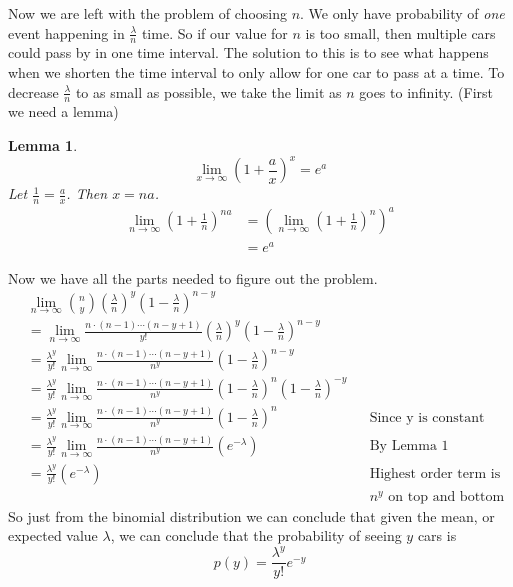 \documentclass{article}
\theoremstyle{plain}
\newtheorem{lemma}{Lemma}
\theoremstyle{definition}
\theoremstyle{remark}
\begin{document}
Now we are left with the problem of choosing $n$. We only have probability of \textit{one} event happening in $\frac{\lambda}{n}$ time. So if our value for $n$ is too small, then multiple cars could pass by in one time interval. The solution to this is to see what happens when we shorten the time interval to only allow for one car to pass at a time. To decrease $\frac{\lambda}{n}$ to as small as possible, we take the limit as $n$ goes to infinity. (First we need a lemma)
\begin{lemma}
$$\lim_{x \to \infty} \left( 1 + \frac{a}{x} \right)^{x} = e^a$$
Let $\displaystyle \frac{1}{n} = \displaystyle \frac{a}{x}$. Then $x = na$.
\begin{align*}
\lim_{n \to \infty} \left( 1 + \frac{1}{n} \right)^{na} &=  \left( \lim_{n \to \infty}(1 + \frac{1}{n} )^{n} \right)^a\\
&= e^a
\end{align*}
\end{lemma}
Now we have all the parts needed to figure out the problem.
\begin{align*}
  &\lim_{n \to \infty} {n \choose y}\left(\frac{\lambda}{n}\right)^{y}\left(1 - \frac{\lambda}{n}\right)^{n-y}\\
  &=\lim_{n \to \infty}\frac{n \cdot (n - 1) \cdots (n - y + 1)}{y!} \left( \frac{\lambda}{n} \right)^y \left(1 - \frac{\lambda}{n} \right)^{n-y}\\
  &= \frac{\lambda^y}{y!} \lim_{n \to \infty}\frac{n \cdot (n - 1) \cdots (n - y + 1)}{n^y} \left(1 - \frac{\lambda}{n} \right)^{n-y}\\
  &= \frac{\lambda^y}{y!} \lim_{n \to \infty}\frac{n \cdot (n - 1) \cdots (n - y + 1)}{n^y} \left(1 - \frac{\lambda}{n} \right)^{n} \left(1 - \frac{\lambda}{n} \right)^{-y}\\
  &= \frac{\lambda^y}{y!} \lim_{n \to \infty}\frac{n \cdot (n - 1) \cdots (n - y + 1)}{n^y} \left(1 - \frac{\lambda}{n} \right)^{n} && \text{Since y is constant}\\
  &= \frac{\lambda^y}{y!} \lim_{n \to \infty}\frac{n \cdot (n - 1) \cdots (n - y + 1)}{n^y} \left( e^{-\lambda} \right) && \text{By Lemma 1}\\
  &= \frac{\lambda^y}{y!} \left( e^{-\lambda} \right) && \text{Highest order term is}\\
  & && \text{$n^y$ on top and bottom}
\end{align*}
So just from the binomial distribution we can conclude that given the mean, or expected value $\lambda$, we can conclude that the probability of seeing $y$ cars is
$$
 p(y) = \displaystyle \frac{\lambda^y}{y!} e^{-y}
$$
\end{document}
